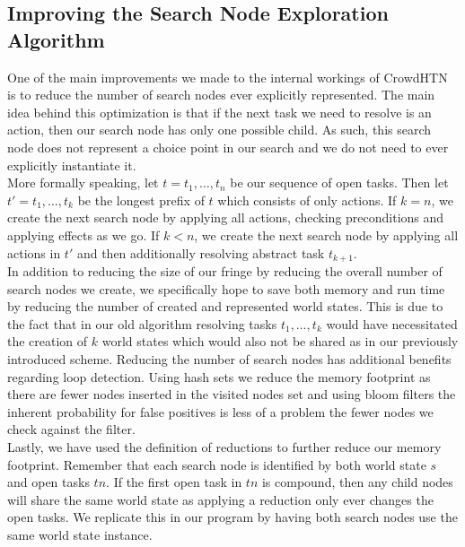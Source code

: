 \subsection{Improving the Search Node Exploration Algorithm}
\label{impl: reduce nodes}
One of the main improvements we made to the internal workings of CrowdHTN is to reduce the number of search nodes ever explicitly represented. The main idea behind this optimization is that if the next task we need to resolve is an action, then our search node has only one possible child. As such, this search node does not represent a choice point in our search and we do not need to ever explicitly instantiate it. \\
More formally speaking, let $t = t_1, \ldots, t_n$ be our sequence of open tasks. Then let $t' = t_1, \ldots, t_k$ be the longest prefix of $t$ which consists of only actions. If $k = n$, we create the next search node by applying all actions, checking preconditions and applying effects as we go. If $k < n$, we create the next search node by applying all actions in $t'$ and then additionally resolving abstract task $t_{k+1}$. \\
In addition to reducing the size of our fringe by reducing the overall number of search nodes we create, we specifically hope to save both memory and run time by reducing the number of created and represented world states. This is due to the fact that in our old algorithm resolving tasks $t_1, \ldots, t_k$ would have necessitated the creation of $k$ world states which would also not be shared as in our previously introduced scheme. Reducing the number of search nodes has additional benefits regarding loop detection. Using hash sets we reduce the memory footprint as there are fewer nodes inserted in the visited nodes set and using bloom filters the inherent probability for false positives is less of a problem the fewer nodes we check against the filter. \\
Lastly, we have used the definition of reductions to further reduce our memory footprint. Remember that each search node is identified by both world state $s$ and open tasks $tn$. If the first open task in $tn$ is compound, then any child nodes will share the same world state as applying a reduction only ever changes the open tasks. We replicate this in our program by having both search nodes use the same world state instance.
\begin{comment}
- first task in task network may be action
- then there is only one possible child
- the search node is not actually interesting in that it does not represent a choice point in our graph
- new definition of a search step: for sequence of open tasks $t_1, \ldots, t_k$, let $t_1, \ldots, t_m$ be the longest prefix consisting of all actions
\end{comment}
